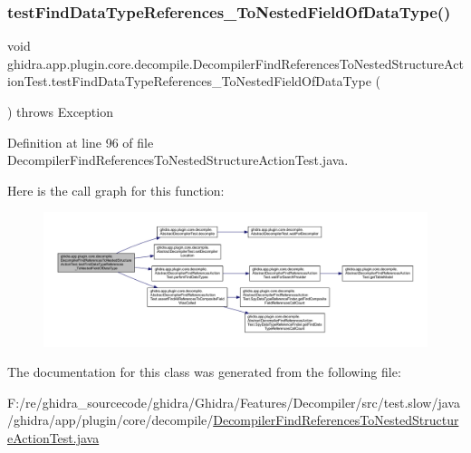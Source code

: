 \subsubsection{\texorpdfstring{testFindDataTypeReferences\_ToNestedFieldOfDataType()}{testFindDataTypeReferences\_ToNestedFieldOfDataType()}}
{\footnotesize\ttfamily void ghidra.\+app.\+plugin.\+core.\+decompile.\+Decompiler\+Find\+References\+To\+Nested\+Structure\+Action\+Test.\+test\+Find\+Data\+Type\+References\+\_\+\+To\+Nested\+Field\+Of\+Data\+Type (\begin{DoxyParamCaption}{ }\end{DoxyParamCaption}) throws Exception\hspace{0.3cm}{\ttfamily [inline]}}



Definition at line 96 of file Decompiler\+Find\+References\+To\+Nested\+Structure\+Action\+Test.\+java.

Here is the call graph for this function\+:
\nopagebreak
\begin{figure}[H]
\begin{center}
\leavevmode
\includegraphics[width=350pt]{classghidra_1_1app_1_1plugin_1_1core_1_1decompile_1_1_decompiler_find_references_to_nested_structure_action_test_ad31c616b6ebca3744f23292f3f6a47a2_cgraph}
\end{center}
\end{figure}


The documentation for this class was generated from the following file\+:\begin{DoxyCompactItemize}
\item 
F\+:/re/ghidra\+\_\+sourcecode/ghidra/\+Ghidra/\+Features/\+Decompiler/src/test.\+slow/java/ghidra/app/plugin/core/decompile/\mbox{\hyperlink{_decompiler_find_references_to_nested_structure_action_test_8java}{Decompiler\+Find\+References\+To\+Nested\+Structure\+Action\+Test.\+java}}\end{DoxyCompactItemize}
